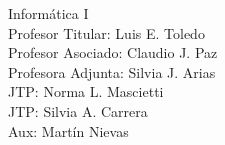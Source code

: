 \thispagestyle{empty}

\Large{Informática I}\\

\noindent Profesor Titular: Luis E. Toledo\\
Profesor Asociado: Claudio J. Paz\\
Profesora Adjunta: Silvia J. Arias\\

\medskip
\noindent JTP: Norma L. Mascietti\\
JTP: Silvia A. Carrera\\
Aux: Martín Nievas

